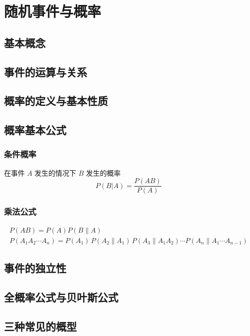 \chapter{随机事件与概率}

\section{基本概念}
\label{sec:基本概念}

\section{事件的运算与关系}
\label{sec:事件的运算与关系}

\section{概率的定义与基本性质}
\label{sec:概率的定义与基本性质}

\section{概率基本公式}
\label{sec:概率基本公式}

\subsection{条件概率}
\label{sub:条件概率}


在事件 $A$ 发生的情况下 $B$ 发生的概率
\[
    P(B|A) = \frac{P(AB)}{P(A)}
\]

\subsection{乘法公式}
\label{sub:乘法公式}

\[
    \begin{aligned}
        P(AB) = P(A) P(B\|A) \\
        P(A_1 A_2 \cdots A_n) = P(A_1)\, P(A_2 \| A_1) \, P(A_3 \| A_1 A_2) \cdots P(A_n \| A_1 \cdots A_{n-1})
    \end{aligned}
\]

\section{事件的独立性}
\label{sec:事件的独立性}

\section{全概率公式与贝叶斯公式}
\label{sec:全概率公式与贝叶斯公式}

\section{三种常见的概型}
\label{sec:三种常见的概型}
